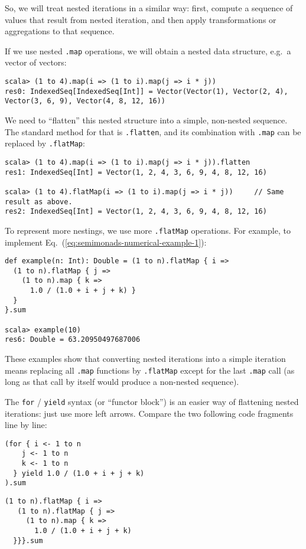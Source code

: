 So, we will treat nested iterations in a similar way: first, compute
a sequence of values that result from nested iteration, and then apply
transformations or aggregations to that sequence.

If we use nested \lstinline!.map! operations, we will obtain a nested
data structure, e.g.~a vector of vectors:
\begin{lstlisting}
scala> (1 to 4).map(i => (1 to i).map(j => i * j))
res0: IndexedSeq[IndexedSeq[Int]] = Vector(Vector(1), Vector(2, 4), Vector(3, 6, 9), Vector(4, 8, 12, 16))
\end{lstlisting}
We need to ``flatten'' this nested structure into a simple, non-nested
sequence. The standard method for that is \lstinline!.flatten!, and
its combination with \lstinline!.map! can be replaced by \lstinline!.flatMap!:
\begin{lstlisting}
scala> (1 to 4).map(i => (1 to i).map(j => i * j)).flatten
res1: IndexedSeq[Int] = Vector(1, 2, 4, 3, 6, 9, 4, 8, 12, 16)

scala> (1 to 4).flatMap(i => (1 to i).map(j => i * j))     // Same result as above.
res2: IndexedSeq[Int] = Vector(1, 2, 4, 3, 6, 9, 4, 8, 12, 16)
\end{lstlisting}
To represent more nestings, we use more \lstinline!.flatMap! operations.
For example, to implement Eq.~(\ref{eq:semimonads-numerical-example-1}):
\begin{lstlisting}
def example(n: Int): Double = (1 to n).flatMap { i =>
  (1 to n).flatMap { j =>
    (1 to n).map { k => 
      1.0 / (1.0 + i + j + k) }
  }
}.sum

scala> example(10)
res6: Double = 63.20950497687006
\end{lstlisting}
These examples show that converting nested iterations into a simple
iteration means replacing all \lstinline!.map! functions by \lstinline!.flatMap!
except for the last \lstinline!.map! call (as long as that call by
itself would produce a non-nested sequence).

The \lstinline!for! / \lstinline!yield! syntax (or ``functor block'')
is an easier way of flattening nested iterations: just use more left
arrows. Compare the two following code fragments line by line:

\noindent \texttt{\textcolor{blue}{\footnotesize{}}}%
\begin{minipage}[c]{0.475\columnwidth}%
\texttt{\textcolor{blue}{\footnotesize{}}}
\begin{lstlisting}
(for { i <- 1 to n
    j <- 1 to n
    k <- 1 to n
  } yield 1.0 / (1.0 + i + j + k)
).sum
\end{lstlisting}
%
\end{minipage}\texttt{\textcolor{blue}{\footnotesize{}\hspace*{\fill}}}%
\begin{minipage}[c]{0.475\columnwidth}%
\texttt{\textcolor{blue}{\footnotesize{}}}
\begin{lstlisting}
(1 to n).flatMap { i =>
   (1 to n).flatMap { j =>
     (1 to n).map { k =>
       1.0 / (1.0 + i + j + k)
  }}}.sum
\end{lstlisting}
%
\end{minipage}{\footnotesize\par}

